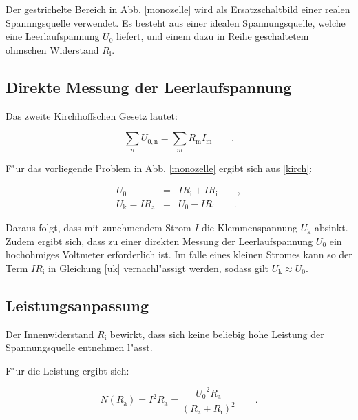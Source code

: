 Der gestrichelte Bereich in Abb. \ref{monozelle} wird als Ersatzschaltbild einer realen Spannngsquelle verwendet.
Es besteht aus einer idealen Spannungsquelle, welche eine Leerlaufspannung $U_\mathrm{0}$ liefert, und einem dazu in Reihe geschaltetem ohmschen Widerstand $R_\mathrm{i}$.

\subsection{Direkte Messung der Leerlaufspannung} %
\label{sub:direkte_messung_der_leerlaufspannung}

Das zweite Kirchhoffschen Gesetz lautet:

\begin{equation}
	\sum_n U_\mathrm{0,n} = \sum_m R_\mathrm{m} I_\mathrm{m} \qquad . \label{kirch}
\end{equation}

F"ur das vorliegende Problem in Abb. \ref{monozelle} ergibt sich aus \eqref{kirch}:

\begin{eqnarray}
	U_\mathrm{0} &=& I R_\mathrm{i} + I R_\mathrm{i} \qquad , \nonumber \\
	U_\mathrm{k} = I R_\mathrm{a} &=& U_\mathrm{0} - I R_\mathrm{i} \qquad . \label{uk}
\end{eqnarray}

Daraus folgt, dass mit zunehmendem Strom $I$ die Klemmenspannung $U_\mathrm{k}$ absinkt.
Zudem ergibt sich, dass zu einer direkten Messung der Leerlaufspannung $U_\mathrm{0}$ ein hochohmiges Voltmeter erforderlich ist. Im falle eines kleinen Stromes kann so der Term $I R_\mathrm{i}$ in Gleichung \eqref{uk} vernachl"assigt werden, sodass gilt $U_\mathrm{k} \approx U_\mathrm{0}$.

\subsection{Leistungsanpassung} %
\label{sub:leistungsanpassung}

Der Innenwiderstand $R_\mathrm{i}$ bewirkt, dass sich keine beliebig hohe Leistung der Spannungsquelle entnehmen l"asst.

F"ur die Leistung ergibt sich:

\begin{equation}
	N(R_\mathrm{a}) = I^2 R_\mathrm{a} = \frac{{U_\mathrm{0} }^2 R_\mathrm{a}}{{(R_\mathrm{a} + R_\mathrm{i})}^2} \qquad .
\end{equation}

